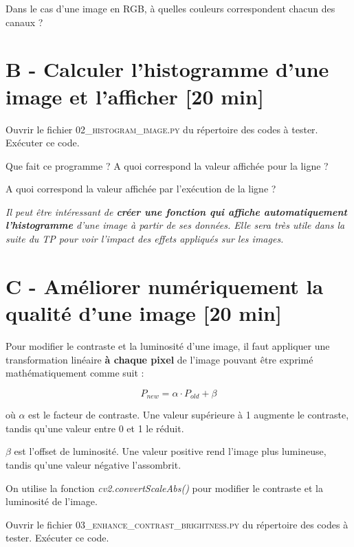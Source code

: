 \Quest Dans le cas d'une image en RGB, à quelles couleurs correspondent chacun des canaux ?

\section{B - Calculer l'histogramme d'une image et l'afficher {[20 min]}}

\Manip Ouvrir le fichier \textsc{02\_histogram\_image.py} du répertoire des codes à tester. Exécuter ce code.

\Quest Que fait ce programme ? A quoi correspond la valeur affichée pour la ligne  ?

\Quest A quoi correspond la valeur affichée par l'exécution de la ligne  ?

\bigskip

\textit{Il peut être intéressant de \textbf{créer une fonction qui affiche automatiquement l'histogramme} d'une image à partir de ses données. Elle sera très utile dans la suite du TP pour voir l'impact des effets appliqués sur les images.}


\section{C - Améliorer numériquement la qualité d'une image {[20 min]}}

Pour modifier le contraste et la luminosité d'une image, il faut appliquer une transformation linéaire \textbf{à chaque pixel} de l'image pouvant être exprimé mathématiquement comme suit :

$$P_{new} = \alpha \cdot P_{old} + \beta$$

où $\alpha$ est le facteur de contraste. Une valeur supérieure à 1 augmente le contraste, tandis qu'une valeur entre 0 et 1 le réduit.

$\beta$ est l'offset de luminosité. Une valeur positive rend l'image plus lumineuse, tandis qu'une valeur négative l'assombrit.

\medskip

On utilise la fonction \textsl{cv2.convertScaleAbs()} pour modifier le contraste et la luminosité de l'image.

\bigskip

\Manip Ouvrir le fichier \textsc{03\_enhance\_contrast\_brightness.py} du répertoire des codes à tester. Exécuter ce code.

